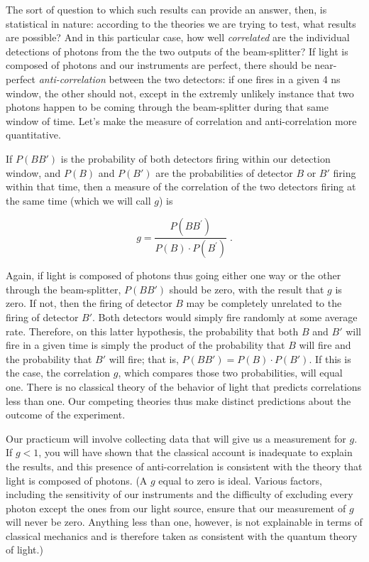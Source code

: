 The sort of question to which such results can provide an answer, then, is statistical in nature: according to the theories we are trying to test, what results are possible? And in this particular case, how well \emph{correlated} are the individual detections of photons from the the two outputs of the beam-splitter? If light is composed of photons and our instruments are perfect, there should be near-perfect \emph{anti-correlation} between the two detectors: if one fires in a given 4 ns window, the other should not, except in the extremly unlikely instance that two photons happen to be coming through the beam-splitter during that same window of time. Let's make the measure of correlation and anti-correlation more quantitative.

If $P(BB')$ is the probability of both detectors firing within our detection window, and $P(B)$ and $P(B')$ are the probabilities of detector $B$ or $B'$ firing within that time, then a measure of the correlation of the two detectors firing at the same time (which we will call $g$) is

\[g = \frac{P(BB^\prime)}{P(B) \cdot P(B^\prime)} \; . \]



Again, if light is composed of photons thus going either one way or the other through the beam-splitter, $P(BB')$ should be zero, with the result that $g$ is zero.  If not, then the firing of detector $B$ may be completely unrelated to the firing of detector $B'$.  Both detectors would simply fire randomly at some average rate.  Therefore, on this latter hypothesis, the probability that both $B$ and $B'$ will fire in a given time is simply the product of the probability that $B$ will fire and the probability that $B'$ will fire; that is, $P(BB') = P(B)\cdot P(B')$. If this is the case, the correlation $g$, which compares those two probabilities, will equal one.  There is no classical theory of the behavior of light that predicts correlations less than one. Our competing theories thus make distinct predictions about the outcome of the experiment.

Our practicum will involve collecting data that will give us a measurement for $g$.  If $g<1$, you will have shown that the classical account is inadequate to explain the results, and this presence of anti-correlation is consistent with the theory that light is composed of photons.  (A $g$ equal to zero is ideal.  Various factors, including the sensitivity of our instruments and the difficulty of excluding every photon except the ones from our light source, ensure that our measurement of $g$ will never be zero.  Anything less than one, however, is not explainable in terms of classical mechanics and is therefore taken as consistent with the quantum theory of light.)


